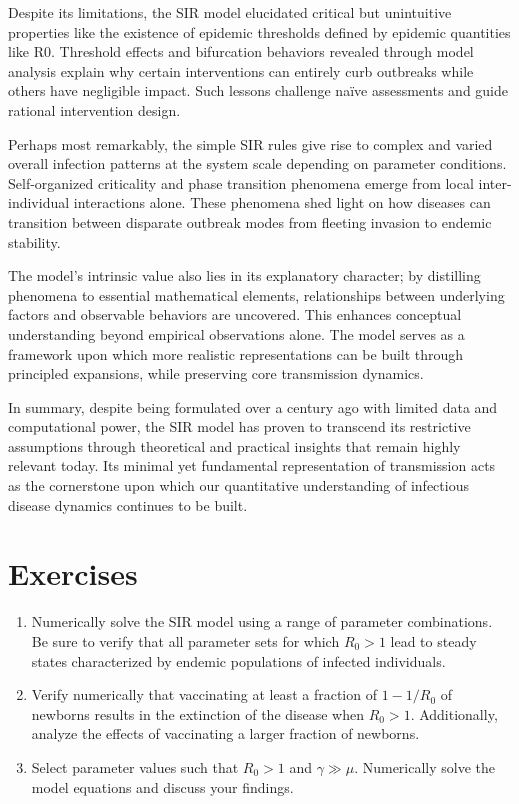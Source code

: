 Despite its limitations, the SIR model elucidated critical but unintuitive properties like the existence of epidemic thresholds defined by epidemic quantities like R0. Threshold effects and bifurcation behaviors revealed through model analysis explain why certain interventions can entirely curb outbreaks while others have negligible impact. Such lessons challenge naïve assessments and guide rational intervention design.

Perhaps most remarkably, the simple SIR rules give rise to complex and varied overall infection patterns at the system scale depending on parameter conditions. Self-organized criticality and phase transition phenomena emerge from local inter-individual interactions alone. These phenomena shed light on how diseases can transition between disparate outbreak modes from fleeting invasion to endemic stability.

The model's intrinsic value also lies in its explanatory character; by distilling phenomena to essential mathematical elements, relationships between underlying factors and observable behaviors are uncovered. This enhances conceptual understanding beyond empirical observations alone. The model serves as a framework upon which more realistic representations can be built through principled expansions, while preserving core transmission dynamics.

In summary, despite being formulated over a century ago with limited data and computational power, the SIR model has proven to transcend its restrictive assumptions through theoretical and practical insights that remain highly relevant today. Its minimal yet fundamental representation of transmission acts as the cornerstone upon which our quantitative understanding of infectious disease dynamics continues to be built.

\section{Exercises}

\begin{enumerate}
    \item Numerically solve the SIR model using a range of parameter combinations. Be sure to verify that all parameter sets for which $R_0 > 1$ lead to steady states characterized by endemic populations of infected individuals.
  
    \item Verify numerically that vaccinating at least a fraction of $1 - 1/R_0$ of newborns results in the extinction of the disease when $R_0 > 1$. Additionally, analyze the effects of vaccinating a larger fraction of newborns.
  
    \item Select parameter values such that $R_0 > 1$ and $\gamma \gg \mu$. Numerically solve the model equations and discuss your findings.
  
\end{enumerate}
  